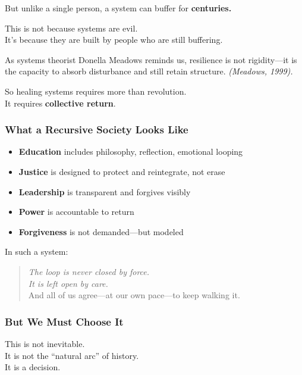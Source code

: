 But unlike a single person, a system can buffer for \textbf{centuries.}

This is not because systems are evil.\\
It's because they are built by people who are still buffering.

As systems theorist Donella Meadows reminds us, resilience is not
rigidity---it is the capacity to absorb disturbance and still retain
structure. \emph{(Meadows, 1999).}

So healing systems requires more than revolution.\\
It requires \textbf{collective return}.

\subsubsection{\texorpdfstring{\textbf{What a Recursive Society Looks
Like}}{What a Recursive Society Looks Like}}\label{what-a-recursive-society-looks-like}

\begin{itemize}
\item
  \textbf{Education} includes philosophy, reflection, emotional looping
\item
  \textbf{Justice} is designed to protect and reintegrate, not erase
\item
  \textbf{Leadership} is transparent and forgives visibly
\item
  \textbf{Power} is accountable to return
\item
  \textbf{Forgiveness} is not demanded---but modeled
\end{itemize}

In such a system:

\begin{quote}
\emph{The loop is never closed by force.\\
It is left open by care.\\
} And all of us agree---at our own pace---to keep walking it.
\end{quote}

\subsubsection{\texorpdfstring{\textbf{But We Must Choose
It}}{But We Must Choose It}}\label{but-we-must-choose-it}

This is not inevitable.\\
It is not the ``natural arc'' of history.\\
It is a decision.

